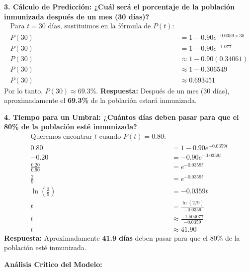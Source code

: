 \documentclass[12pt, a4paper]{article}
\begin{document}
\vspace{0.5em}
\noindent \textbf{3. Cálculo de Predicción: ¿Cuál será el porcentaje de la población inmunizada después de un mes (30 días)?}
\begin{align*}
\text{Para } t = 30 \text{ días, sustituimos en la fórmula de } P(t)\text{:} \\
P(30) &= 1 - 0.90e^{-0.0359 \times 30} \\
P(30) &= 1 - 0.90e^{-1.077} \\
P(30) &\approx 1 - 0.90(0.34061) \\
P(30) &\approx 1 - 0.306549 \\
P(30) &\approx 0.693451
\end{align*}
Por lo tanto, $P(30) \approx 69.3\%$.
\textbf{Respuesta:} Después de un mes (30 días), aproximadamente el \textbf{69.3\%} de la población estará inmunizada.

\vspace{0.5em}
\noindent \textbf{4. Tiempo para un Umbral: ¿Cuántos días deben pasar para que el 80\% de la población esté inmunizada?}
\begin{align*}
\text{Queremos encontrar } t \text{ cuando } P(t) = 0.80\text{:} \\
0.80 &= 1 - 0.90e^{-0.0359t} \\
-0.20 &= -0.90e^{-0.0359t} \\
\frac{0.20}{0.90} &= e^{-0.0359t} \\
\frac{2}{9} &= e^{-0.0359t} \\
\ln\left(\frac{2}{9}\right) &= -0.0359t \\
t &= \frac{\ln(2/9)}{-0.0359} \\
t &\approx \frac{-1.504077}{-0.0359} \\
t &\approx 41.90
\end{align*}
\textbf{Respuesta:} Aproximadamente \textbf{41.9 días} deben pasar para que el 80\% de la población esté inmunizada.

\vspace{0.5em}
\noindent \textbf{Análisis Crítico del Modelo:}
\end{document}
